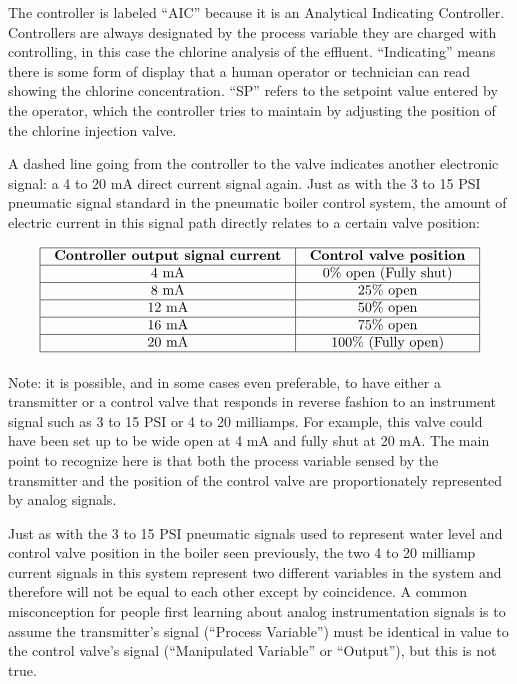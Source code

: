 The controller is labeled ``AIC'' because it is an Analytical Indicating Controller.  Controllers are always designated by the process variable they are charged with controlling, in this case the chlorine analysis of the effluent.  ``Indicating'' means there is some form of display that a human operator or technician can read showing the chlorine concentration.  ``SP'' refers to the setpoint value entered by the operator, which the controller tries to maintain by adjusting the position of the chlorine injection valve.

A dashed line going from the controller to the valve indicates another electronic signal: a 4 to 20 mA direct current signal again.  Just as with the 3 to 15 PSI pneumatic signal standard in the pneumatic boiler control system, the amount of electric current in this signal path directly relates to a certain valve position:

$$\vbox{\offinterlineskip
\halign{\strut
\vrule \quad\hfil # \ \hfil & 
\vrule \quad\hfil # \ \hfil \vrule \cr
\noalign{\hrule}
%
\textbf{Controller output signal current} & \textbf{Control valve position} \cr
%
\noalign{\hrule}
%
4 mA & 0\% open (Fully shut) \cr
%
\noalign{\hrule}
%
8 mA & 25\% open \cr
%
\noalign{\hrule}
%
12 mA & 50\% open \cr
%
\noalign{\hrule}
%
16 mA & 75\% open \cr
%
\noalign{\hrule}
%
20 mA & 100\% (Fully open) \cr
%
\noalign{\hrule}
} %
}$$ %

Note: it is possible, and in some cases even preferable, to have either a transmitter or a control valve that responds in reverse fashion to an instrument signal such as 3 to 15 PSI or 4 to 20 milliamps.  For example, this valve could have been set up to be wide open at 4 mA and fully shut at 20 mA.  The main point to recognize here is that both the process variable sensed by the transmitter and the position of the control valve are proportionately represented by analog signals.

Just as with the 3 to 15 PSI pneumatic signals used to represent water level and control valve position in the boiler seen previously, the two 4 to 20 milliamp current signals in this system represent two different variables in the system and therefore will not be equal to each other except by coincidence.  A common misconception for people first learning about analog instrumentation signals is to assume the transmitter's signal (``Process Variable'') must be identical in value to the control valve's signal (``Manipulated Variable'' or ``Output''), but this is not true.

